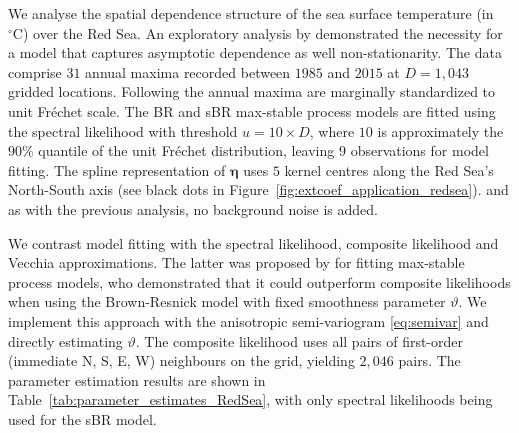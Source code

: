 \documentclass[12pt]{article}
\begin{document}
We analyse the spatial dependence structure of the sea surface temperature (in $^\circ \textrm{C}$) over the Red Sea. 
An exploratory analysis 
by \citet{Hazra.Huser:2021} demonstrated the necessity for a model that captures asymptotic dependence as well 
non-stationarity. 
%
The data comprise $31$ annual maxima recorded between $1985$ and $2015$ at $D=1,043$ gridded locations.
%
Following 
\cite{Huser.Zhong:2023}
the annual maxima are marginally standardized to unit Fr\'{e}chet scale. 
%
The BR and sBR max-stable process models
are fitted using the spectral likelihood with threshold $u=10\times D$, where $10$ 
is approximately 
the $90\%$ quantile of the unit Fr\'echet distribution, leaving $9$ observations for model fitting.
%
The spline representation of $\bm\eta$ 
uses $5$ kernel centres 
along the Red Sea's North-South axis 
(see black dots in Figure~\ref{fig:extcoef_application_redsea}). 
and as with
the previous analysis, no background noise is added. 
%

We contrast model fitting with the spectral likelihood, composite likelihood and Vecchia approximations.
%
The latter was proposed by \cite{Huser.Zhong:2023} for fitting max-stable process models, who demonstrated that it could outperform composite likelihoods when using the Brown-Resnick model with fixed smoothness parameter $\vartheta$. We implement this approach with the anisotropic semi-variogram \eqref{eq:semivar} and directly estimating $\vartheta$.
%
The composite likelihood uses all pairs of first-order (immediate N, S, E, W) neighbours on the grid, yielding $2,046$ pairs. 
%
The parameter estimation results are shown in Table~\ref{tab:parameter_estimates_RedSea}, with only spectral likelihoods being used for the sBR model.
\end{document}

